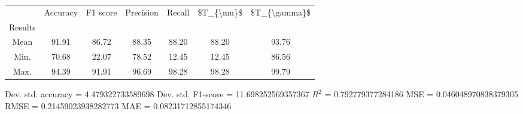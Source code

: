 \begin{tabular}{|c|c|c|c|c|c|c|}
\toprule
{} &  Accuracy &  F1 score &  Precision &  Recall &  \$T\_\{\textbackslash mu\}\$ &  \$T\_\{\textbackslash gamma\}\$ \\
Results &           &           &            &         &            &               \\
\hline
Mean    &     91.91 &     86.72 &      88.35 &   88.20 &      88.20 &         93.76 \\
Min.    &     70.68 &     22.07 &      78.52 &   12.45 &      12.45 &         86.56 \\
Max.    &     94.39 &     91.91 &      96.69 &   98.28 &      98.28 &         99.79 \\
\bottomrule
\end{tabular}

 Dev. std. accuracy = 4.479322733589698
 Dev. std. F1-score = 11.698252569357367
 $R^2$ = 0.792779377284186
 MSE = 0.046048970838379305
 RMSE = 0.21459023938282773
 MAE = 0.08231712855174346